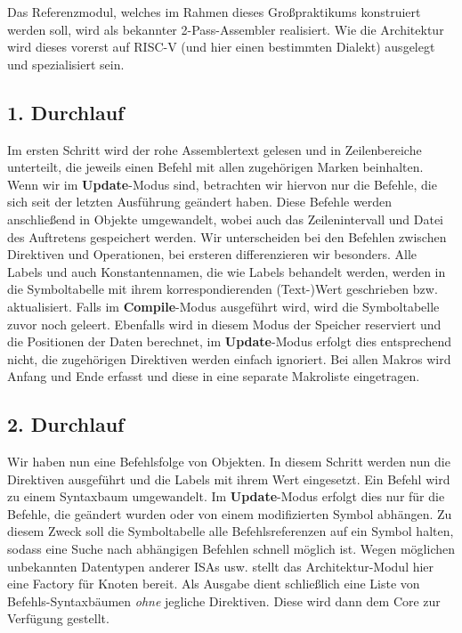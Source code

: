 Das Referenzmodul, welches im Rahmen dieses Großpraktikums konstruiert werden
soll, wird als bekannter 2-Pass-Assembler realisiert. Wie die Architektur wird
dieses vorerst auf RISC-V (und hier einen bestimmten Dialekt) ausgelegt und
spezialisiert sein.

\subsection{1. Durchlauf}

Im ersten Schritt wird der rohe Assemblertext gelesen und in Zeilenbereiche
unterteilt, die jeweils einen Befehl mit allen zugehörigen Marken beinhalten.
Wenn wir im \textbf{Update}-Modus sind, betrachten wir hiervon nur die Befehle, die sich seit der letzten Ausführung geändert haben.
Diese Befehle werden anschließend in Objekte umgewandelt, wobei auch das Zeilenintervall und Datei des Auftretens gespeichert werden. Wir unterscheiden bei den Befehlen zwischen Direktiven und Operationen, bei ersteren differenzieren wir besonders. Alle Labels und auch Konstantennamen, die wie Labels behandelt werden, werden in die Symboltabelle mit ihrem
korrespondierenden (Text-)Wert geschrieben bzw. aktualisiert. Falls im \textbf{Compile}-Modus ausgeführt wird, wird die Symboltabelle zuvor noch geleert. Ebenfalls wird in diesem Modus der Speicher reserviert
und die Positionen der Daten berechnet, im \textbf{Update}-Modus erfolgt dies entsprechend nicht, die zugehörigen Direktiven werden einfach ignoriert.  Bei allen Makros wird Anfang und Ende erfasst und diese in eine separate Makroliste eingetragen.

\subsection{2. Durchlauf}

Wir haben nun eine Befehlsfolge von Objekten. In diesem Schritt werden nun die
Direktiven ausgeführt und die Labels mit ihrem Wert eingesetzt. Ein Befehl wird
zu einem Syntaxbaum umgewandelt. Im \textbf{Update}-Modus erfolgt dies nur für die Befehle, die geändert wurden oder von einem modifizierten Symbol abhängen. Zu diesem Zweck soll die Symboltabelle alle Befehlsreferenzen auf ein Symbol halten, sodass eine Suche nach abhängigen Befehlen schnell möglich ist.
Wegen möglichen unbekannten Datentypen anderer ISAs usw. stellt das Architektur-Modul hier eine Factory für
Knoten bereit.  Als Ausgabe dient schließlich eine
Liste von Befehls-Syntaxbäumen \emph{ohne} jegliche Direktiven. Diese wird dann dem Core zur Verfügung gestellt.

